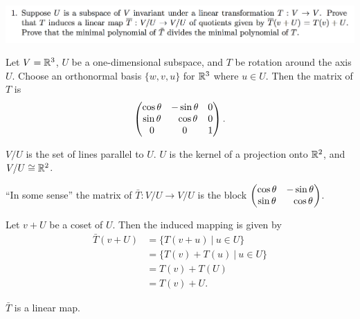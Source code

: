 \begin{mdframed}
  \includegraphics[width=400pt]{img/linear-algebra-a0-2-1.png}
\end{mdframed}
\begin{mdframed}
  \begin{example*}
    Let $V = \mathbb{R}^3$, $U$ be a one-dimensional subspace, and $T$ be rotation around the axis
    $U$. Choose an orthonormal basis $\{w, v, u\}$ for $\mathbb{R}^3$ where $u \in U$. Then the matrix
    of $T$ is
    \begin{align*}
      \begin{pmatrix}\cos\theta & -\sin\theta & 0\\\sin\theta & ~~\cos\theta & 0\\0 &            0 & 1\\ \end{pmatrix}.
    \end{align*}

    $V/U$ is the set of lines parallel to $U$. $U$ is the kernel of a projection onto $\mathbb{R}^2$, and
    $V/U \cong \mathbb{R}^2$.

    ``In some sense'' the matrix of $\bar T:V/U \to V/U$ is the block
    $\begin{pmatrix}\cos\theta & -\sin\theta\\\sin\theta & ~~\cos\theta\\ \end{pmatrix}$.
  \end{example*}
\end{mdframed}

Let $v + U$ be a coset of $U$. Then the induced mapping is given by
\begin{align*}
  \bar T(v + U) &= \{T(v + u) ~|~ u \in U\}\\
                &= \{T(v) + T(u) ~|~ u \in U\}\\
                &= T(v) + T(U)\\
                &= T(v) + U.
\end{align*}

\begin{claim*}
  $\bar T$ is a linear map.
\end{claim*}


